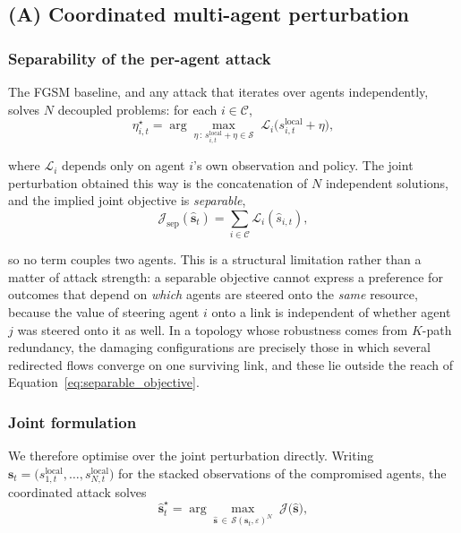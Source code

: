 \subsection{(A) Coordinated multi-agent perturbation}
\label{subsec:coordinated_attack}

\subsubsection*{Separability of the per-agent attack}

The FGSM baseline, and any attack that iterates over agents independently, solves
$N$ decoupled problems: for each $i \in \mathcal{C}$,
\begin{equation}
  \eta_{i,t}^{\star} = \arg\max_{\eta \,:\, s_{i,t}^{\text{local}} + \eta \in \mathcal{S}}
  \; \mathcal{L}_{i}\big(s_{i,t}^{\text{local}} + \eta\big),
  \label{eq:separable_attack}
\end{equation}

\noindent where $\mathcal{L}_i$ depends only on agent $i$'s own observation and
policy. The joint perturbation obtained this way is the concatenation of $N$
independent solutions, and the implied joint objective is \emph{separable},
\begin{equation}
  \mathcal{J}_{\text{sep}}(\hat{\mathbf{s}}_t)
  = \sum_{i \in \mathcal{C}} \mathcal{L}_i(\hat{s}_{i,t}),
  \label{eq:separable_objective}
\end{equation}

\noindent so no term couples two agents. This is a structural limitation rather
than a matter of attack strength: a separable objective cannot express a preference
for outcomes that depend on \emph{which} agents are steered onto the \emph{same}
resource, because the value of steering agent $i$ onto a link is independent of
whether agent $j$ was steered onto it as well. In a topology whose robustness comes
from $K$-path redundancy, the damaging configurations are precisely those in which
several redirected flows converge on one surviving link, and these lie outside the
reach of Equation~\eqref{eq:separable_objective}.

\subsubsection*{Joint formulation}

We therefore optimise over the joint perturbation directly. Writing
$\mathbf{s}_t = \big(s_{1,t}^{\text{local}}, \dots, s_{N,t}^{\text{local}}\big)$ for
the stacked observations of the compromised agents, the coordinated attack solves
\begin{equation}
  \hat{\mathbf{s}}_t^{\star}
  = \arg\max_{\hat{\mathbf{s}} \,\in\, \mathcal{S}(\mathbf{s}_t, \varepsilon)^{N}}
  \; \mathcal{J}\big(\hat{\mathbf{s}}\big),
  \label{eq:joint_attack}
\end{equation}

